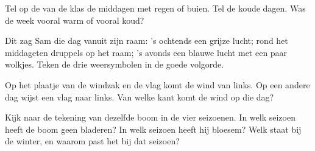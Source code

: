 \begin{exercise}[$\star\star$]\label{exo:g1:watching-the-weather:8}
Tel op de  van de klas de middagen met regen of buien. Tel de
koude dagen. Was de week vooral warm of vooral koud?
\end{exercise}

\begin{exercise}[$\star\star$]\label{exo:g1:watching-the-weather:9}
Dit zag Sam die dag vanuit zijn raam: 's ochtends een grijze lucht; rond
het middageten druppels op het raam; 's avonds een blauwe lucht met een
paar wolkjes. Teken de drie weersymbolen in de goede volgorde.
\end{exercise}

\begin{exercise}[$\star\star$]\label{exo:g1:watching-the-weather:10}
Op het plaatje van de windzak en de vlag komt de wind van links. Op een
andere dag wijst een vlag naar links. Van welke kant komt de wind op die
dag?
\end{exercise}

\begin{exercise}[$\star\star$]\label{exo:g1:watching-the-weather:11}
Kijk naar de tekening van dezelfde boom in de vier seizoenen. In welk
seizoen heeft de boom geen bladeren? In welk seizoen heeft hij bloesem?
Welk  staat bij de winter, en waarom past het bij dat seizoen?
\end{exercise}
